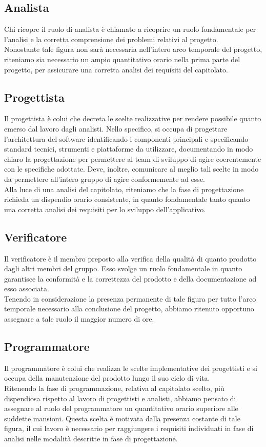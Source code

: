 \documentclass[12pt]{article}
\begin{document}
    \subsection{Analista} \label{subsec:Ana}
Chi ricopre il ruolo di analista è chiamato a ricoprire un ruolo fondamentale per l'analisi e la corretta comprensione dei problemi relativi al progetto.\\
Nonostante tale figura non sarà necessaria nell'intero arco temporale del progetto, riteniamo sia necessario un ampio quantitativo orario nella prima parte del progetto, per assicurare una corretta analisi dei requisiti del capitolato.

    \subsection{Progettista} \label{subsec:proj}
Il progettista è colui che decreta le scelte realizzative per rendere possibile quanto emerso dal lavoro dagli analisti. Nello specifico, si occupa di progettare l'architettura del software identificando i componenti principali e specificando standard tecnici, strumenti e piattaforme da utilizzare, documentando in modo chiaro la progettazione per permettere al team di sviluppo di agire coerentemente con le specifiche adottate. Deve, inoltre, comunicare al meglio tali scelte in modo da permettere all'intero gruppo di agire conformemente ad esse.\\
Alla luce di una analisi del capitolato, riteniamo che la fase di progettazione richieda un dispendio orario consistente, in quanto fondamentale tanto quanto una corretta analisi dei requisiti per lo sviluppo dell'applicativo.
\newpage
\subsection{Verificatore} \label{subsec:Ver}
Il verificatore è il membro preposto alla verifica della qualità di quanto prodotto dagli altri membri del gruppo. Esso svolge un ruolo fondamentale in quanto garantisce la conformità e la correttezza del prodotto e della documentazione ad esso associata.\\
Tenendo in considerazione la presenza permanente di tale figura per tutto l'arco temporale necessario alla conclusione del progetto, abbiamo ritenuto opportuno assegnare a tale ruolo il maggior numero di ore.
    \subsection{Programmatore} \label{subsec:progrm}
Il programmatore è colui che realizza le scelte implementative dei progettisti e si occupa della manutenzione del prodotto lungo il suo ciclo di vita.\\
Ritenendo la fase di programmazione, relativa al capitolato scelto, più dispendiosa rispetto al lavoro di progettisti e analisti, abbiamo pensato di assegnare al ruolo del programmatore un quantitativo orario superiore alle suddette mansioni. Questa scelta è motivata dalla presenza costante di tale figura, il cui lavoro è necessario per raggiungere i requisiti individuati in fase di analisi nelle modalità descritte in fase di progettazione.
\end{document}
